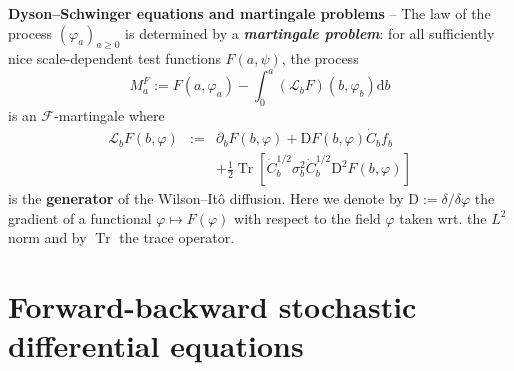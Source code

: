 \documentclass[reprint,aps]{revtex4-2}
\newcommand{\assign}{:=}
\newcommand{\mathD}{\mathrm{D}}
\newcommand{\mathd}{\mathrm{d}}
\newcommand{\tmop}[1]{\ensuremath{\operatorname{#1}}}
\newcommand{\tmtextbf}[1]{\textbf{{{#1}}}}
\newcommand{\tmtextit}[1]{\textit{{{#1}}}}
\begin{document}
\tmtextbf{Dyson--Schwinger equations and martingale problems} -- The law of
the process $(\varphi_a)_{a \geqslant 0}$ is determined by a
\tmtextbf{\tmtextit{martingale problem}}: for all sufficiently nice
scale-dependent test functions $F (a, \psi)$, the process
\[ M^F_a \assign F (a, \varphi_a) - \int_0^a (\mathscr{L}_b F)  (b, \varphi_b)
   \mathd b \]
is an $\mathscr{F}$-martingale where
\begin{equation}
  \begin{array}{lll}
    \mathscr{L}_b F (b, \varphi) & \assign & \partial_b F (b, \varphi) +
    \mathD F (b, \varphi)  \dot{C}_b f_b \\
    &  & + \frac{1}{2} \tmop{Tr} [\dot{C}_b^{1 / 2} \sigma_b^2 \dot{C}_b^{1 /
    2} \mathD^2 F (b, \varphi)]
  \end{array} \label{eq:generator}
\end{equation}
is the \tmtextbf{generator} of the Wilson--It{\^o} diffusion. Here we denote
by $\mathD \assign \delta / \delta \varphi$ the gradient of a functional
$\varphi \mapsto F (\varphi)$ with respect to the field $\varphi$ taken wrt.
the $L^2$ norm and by $\tmop{Tr}$ the trace operator.

\section{Forward-backward stochastic differential equations}
\end{document}
